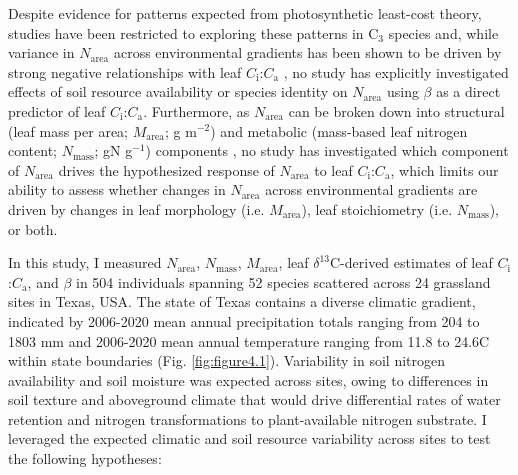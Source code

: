 Despite evidence for patterns expected from photosynthetic least-cost theory, studies have been restricted to exploring these patterns in C$_3$ species and, while variance in $N_\mathrm{area}$ across environmental gradients has been shown to be driven by strong negative relationships with leaf $C_\mathrm{i}$:$C_\mathrm{a}$ , no study has explicitly investigated effects of soil resource availability or species identity on $N_\mathrm{area}$ using $\beta$ as a direct predictor of leaf $C_\mathrm{i}$:$C_\mathrm{a}$. Furthermore, as $N_\mathrm{area}$ can be broken down into structural (leaf mass per area; $M_\mathrm{area}$; g m$^{-2}$) and metabolic (mass-based leaf nitrogen content; $N_\mathrm{mass}$; gN g$^{-1}$) components , no study has investigated which component of $N_\mathrm{area}$ drives the hypothesized response of $N_\mathrm{area}$ to leaf $C_\mathrm{i}$:$C_\mathrm{a}$, which limits our ability to assess whether changes in $N_\mathrm{area}$ across environmental gradients are driven by changes in leaf morphology (i.e. $M_\mathrm{area}$), leaf stoichiometry (i.e. $N_\mathrm{mass}$), or both. 

In this study, I measured $N_\mathrm{area}$, $N_\mathrm{mass}$, $M_\mathrm{area}$, leaf $\delta^{13}$C-derived estimates of leaf $C_\mathrm{i}$:$C_\mathrm{a}$, and $\beta$ in 504 individuals spanning 52 species scattered across 24 grassland sites in Texas, USA. The state of Texas contains a diverse climatic gradient, indicated by 2006-2020 mean annual precipitation totals ranging from 204 to 1803 mm and 2006-2020 mean annual temperature ranging from 11.8\textdegree{} to 24.6\textdegree{}C within state boundaries (Fig. \ref{fig:figure4.1}). Variability in soil nitrogen availability and soil moisture was expected across sites, owing to differences in soil texture and aboveground climate that would drive differential rates of water retention and nitrogen transformations to plant-available nitrogen substrate. I leveraged the expected climatic and soil resource variability across sites to test the following hypotheses:

